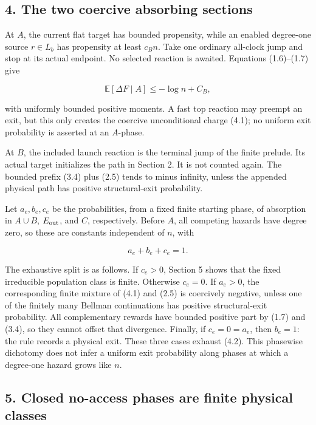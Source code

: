 \subsection{4. The two coercive absorbing
sections}

At \(A\), the current flat target has bounded propensity, while an
enabled degree-one source \(r\in L_b\) has propensity at least
\(c_B n\). Take one ordinary all-clock jump and stop at its actual
endpoint. No selected reaction is awaited. Equations (1.6)--(1.7) give

\[
             \mathbb E[\Delta F\mid A]\le-\log n+C_B,              \tag{4.1}
\]

with uniformly bounded positive moments. A fast top reaction may preempt
an exit, but this only creates the coercive unconditional charge (4.1);
no uniform exit probability is asserted at an \(A\)-phase.

At \(B\), the included launch reaction is the terminal jump of the
finite prelude. Its actual target initializes the path in Section 2. It
is not counted again. The bounded prefix (3.4) plus (2.5) tends to minus
infinity, unless the appended physical path has positive structural-exit
probability.

Let \(a_e,b_e,c_e\) be the probabilities, from a fixed finite starting
phase, of absorption in \(A\cup B\), \(E_{\rm out}\), and \(C\),
respectively. Before \(A\), all competing hazards have degree zero, so
these are constants independent of \(n\), with

\[
                         a_e+b_e+c_e=1.                \tag{4.2}
\]

The exhaustive split is as follows. If \(c_e>0\), Section 5 shows that
the fixed irreducible population class is finite. Otherwise \(c_e=0\).
If \(a_e>0\), the corresponding finite mixture of (4.1) and (2.5) is
coercively negative, unless one of the finitely many Bellman
continuations has positive structural-exit probability. All
complementary rewards have bounded positive part by (1.7) and (3.4), so
they cannot offset that divergence. Finally, if \(c_e=0=a_e\), then
\(b_e=1\): the rule records a physical exit. These three cases exhaust
(4.2). This phasewise dichotomy does not infer a uniform exit
probability along phases at which a degree-one hazard grows like \(n\).

\subsection{5. Closed no-access phases are finite physical
classes}

